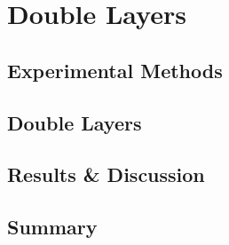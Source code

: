 \documentclass[\main/dresen_thesis.tex]{subfiles}
\renewcommand{\thisPath}{\main/chapters/doublelayers}
\begin{document}
\chapter{Double Layers}\label{ch:doublelayers}
  
  \FloatBarrier
  \clearpage

  \section{Experimental Methods}
    
      \FloatBarrier
      \clearpage

  \section{Double Layers}
    
    \FloatBarrier
      \clearpage

  \section{Results \& Discussion}
    \FloatBarrier
      \clearpage

  \section{Summary}
    
    \FloatBarrier
\end{document}
